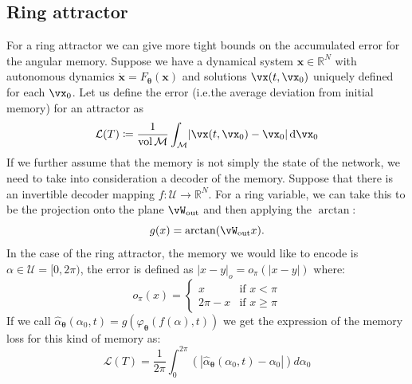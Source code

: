 \documentclass{article} %
\newcounter{ct}
\newcommand{\dm}[1]{\ensuremath{\mathrm{d}{#1}}} %
\newcommand{\wout}{\vW_{\text{out}}}
\newcommand{\manifold}{\mathcal{M}}
\DeclarePairedDelimiter{\abs}{\lvert}{\rvert}
\theoremstyle{definition}
\theoremstyle{remark}
\begin{document}
\subsection{Ring attractor}
For a ring attractor we can give more tight bounds on the accumulated error for the angular memory.
Suppose we have a dynamical system \(\bm{x} \in \mathbb{R}^{N}\) with autonomous dynamics \(\dot{ \bm{x}} = F_{\boldsymbol{\theta}} (\bm{x})\) and solutions \(\vx(t, \vx_{0})\) uniquely defined for each \(\vx_{0}\).
Let us define the error (i.e.the  average deviation from initial memory) for an attractor as
\begin{align}
\mathcal{L}(T) \coloneqq
\frac{1}{\operatorname{vol}\manifold}\int_{\manifold}
\abs{\vx(t, \vx_{0}) - \vx_{0}}\,
\dm{\vx_{0}}
\end{align}
If we further assume that the memory is not simply the state of the network, we need to take into consideration a decoder of the memory.
Suppose that there is an invertible decoder mapping \(f: \mathcal{U} \rightarrow \mathbb{R}^{N}\). %
For a ring variable, we can take this to be the projection onto the plane \(\wout\) and then applying the \(\arctan\):
\begin{equation}
g(x) = \arctan(\wout x). %
\end{equation}%
In the case of the ring attractor, the memory we would like to encode is \(\alpha \in \mathcal{U} = [0, 2 \pi)\), the error is defined as \(|x - y|_{o} = o_{\pi}(|x - y|)\) where: %
\begin{equation}
    o_{\pi}(x) = \begin{cases}
    x & \text{if } x < \pi \\
    2 \pi - x & \text{if } x \geq \pi
    \end{cases}
\end{equation}
If we call \(\hat{\alpha}_{\boldsymbol{\theta}}(\alpha_{0}, t) = g(\varphi_{\bm{\theta}}(f(\alpha),t))\) we get the expression of the memory loss for this kind of memory as:
\begin{equation}
    \mathcal{L}(T) =  \frac{1}{2 \pi} \int_{0}^{2 \pi}    \left( \left| \hat{\alpha}_{\boldsymbol{\theta}}(\alpha_{0}, t) - \alpha_{0}  \right| \right)  d\alpha_{0}
\end{equation}
\end{document}
